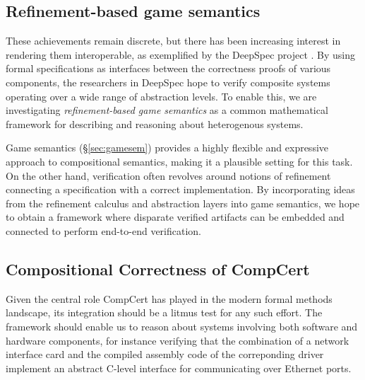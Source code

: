 \documentclass[sigplan,10pt,review,anonymous]{acmart}\settopmatter{printfolios=true,printccs=false,printacmref=false}
\begin{document}

\subsection{Refinement-based game semantics} %

These achievements remain discrete, but
there has been increasing interest in rendering them interoperable,
as exemplified by the DeepSpec project \cite{deepspec}.
By using formal specifications as interfaces
between the correctness proofs of various components, %
the researchers in DeepSpec hope to
verify composite systems
operating over a wide range of abstraction levels.
To enable this,
we are investigating
\emph{refinement-based game semantics}
as a common mathematical framework for
describing and reasoning about heterogenous systems.

Game semantics (\S\ref{sec:gamesem})
provides a highly flexible and expressive approach
to compositional semantics,
making it a plausible setting for this task.
On the other hand,
verification often revolves around notions of refinement
connecting a specification with a correct implementation.
By incorporating ideas from
the refinement calculus \cite{refcal}
and abstraction layers \cite{popl15}
into game semantics,
we hope to obtain a framework where
disparate verified artifacts can be embedded and connected
to perform end-to-end verification.


\subsection{Compositional Correctness of CompCert} %

Given the central role CompCert has played
in the modern formal methods landscape,
its integration
should be a litmus test for any such effort.
The framework should enable us to reason about
systems involving both
software and hardware components,
for instance verifying that
the combination of a network interface card
and the compiled assembly code of the correponding driver
implement an abstract C-level interface
for communicating over Ethernet ports.
\end{document}
